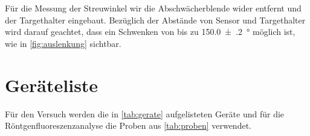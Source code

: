 \documentclass[12pt,english,ngerman]{scrartcl}
\begin{document}
\begin{figure}[H]
	\centering
	 \hfill
\end{figure}


Für die Messung der Streuwinkel wir die Abschwächerblende wider entfernt und der Targethalter eingebaut. 
Bezüglich der Abstände von Sensor und Targethalter wird darauf geachtet, dass ein Schwenken von bis zu 
\SI{150.0(2)}{\degree} möglich ist, wie in \autoref{fig:auslenkung} sichtbar.


\section{Geräteliste}\label{sec:geraeteliste}



Für den Versuch werden die in \autoref{tab:gerate} aufgelisteten
Geräte und für die Röntgenfluoreszenzanalyse die Proben aus \autoref{tab:proben} verwendet.
\end{document}
